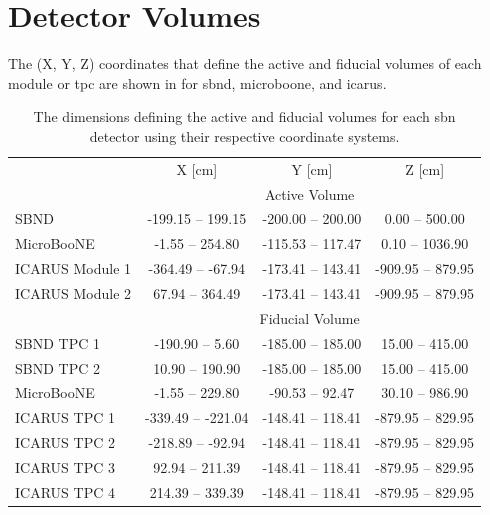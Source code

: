 
\chapter{Detector Volumes}
\label{app:Detector_Volumes}

The (X, Y, Z) coordinates that define the active and fiducial volumes of each module or \gls{tpc} are shown in  for \gls{sbnd}, \gls{microboone}, and \gls{icarus}.

\begin{table}[h!]
	\begin{tabular}{lccc}
		& \multicolumn{1}{c}{X [cm]} & \multicolumn{1}{c}{Y [cm]} & \multicolumn{1}{c}{Z [cm]} \\ \cline{2-4} 
		& \multicolumn{3}{c}{Active Volume} \\ \cline{2-4} 
		SBND & -199.15 -- \phantom{-}199.15 & -200.00 -- 200.00 & \phantom{-00}0.00 -- \phantom{0}500.00 \\
		MicroBooNE & \phantom{00}-1.55 -- \phantom{-}254.80 & -115.53 -- 117.47 & \phantom{-00}0.10 -- 1036.90 \\
		ICARUS Module 1 & -364.49 -- \phantom{0}-67.94 & -173.41 -- 143.41 & -909.95 -- \phantom{0}879.95 \\
		ICARUS Module 2 & \phantom{-0}67.94 -- \phantom{-}364.49 & -173.41 -- 143.41 & -909.95 -- \phantom{0}879.95 \\ \cline{2-4} 
		& \multicolumn{3}{c}{Fiducial Volume} \\ \cline{2-4} 
		SBND TPC 1 & -190.90 -- \phantom{-00}5.60 & -185.00 -- 185.00 & \phantom{-0}15.00 -- 415.00 \\
		SBND TPC 2 & \phantom{-0}10.90 -- \phantom{-}190.90 & -185.00 -- 185.00 & \phantom{-0}15.00 -- 415.00 \\
		MicroBooNE & \phantom{00}-1.55 -- \phantom{-}229.80 & \phantom{0}-90.53 -- \phantom{0}92.47 & \phantom{-0}30.10 -- 986.90 \\
		ICARUS TPC 1 & -339.49 -- -221.04 & -148.41 -- 118.41 & -879.95 -- 829.95 \\
		ICARUS TPC 2 & -218.89 -- \phantom{0}-92.94 & -148.41 -- 118.41 & -879.95 -- 829.95 \\
		ICARUS TPC 3 & \phantom{-0}92.94 -- \phantom{-}211.39 & -148.41 -- 118.41 & -879.95 -- 829.95 \\
		ICARUS TPC 4 & \phantom{-}214.39 -- \phantom{-}339.39 & -148.41 -- 118.41 & -879.95 -- 829.95
	\end{tabular}
	\caption[The active and fiducial volumes of the \gls{sbn} detectors.]{The dimensions defining the active and fiducial volumes for each \gls{sbn} detector using their respective coordinate systems.} \label{table:active_and_fiducial_volumes}
\end{table}

